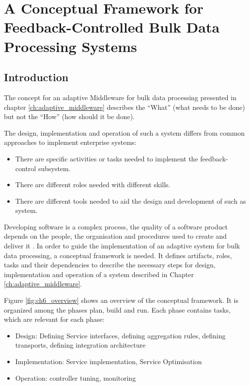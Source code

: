 

\chapter[Conceptual Framework]{A Conceptual Framework for Feedback-Controlled Bulk Data Processing Systems}\label{ch:conceptual_framework}

\section{Introduction} 

The concept for an adaptive Middleware for bulk data processing presented in chapter \ref{ch:adaptive_middleware} describes the ``What'' (what needs to be done) but not the ``How'' (how should it be done).

The design, implementation and operation of such a system differs from common approaches to implement enterprise systems:
\begin{itemize}
	\item There are specific activities or tasks needed to implement the feedback-control subsystem.
	\item There are different roles needed with different skills.
	\item There are different tools needed to aid the design and development of such as system.
\end{itemize}

Developing software is a complex process, the quality of a software product depends on the people, the organisation and procedures used to create and deliver it \citep{Fuggetta:2000ds}.
In order to guide the implementation of an adaptive system for bulk data processing, a conceptual framework is needed. It defines artifacts, roles, tasks and their dependencies to describe the necessary steps for design, implementation and operation of a system described in Chapter \ref{ch:adaptive_middleware}.

Figure \ref{fig:ch6_overview} shows an overview of the conceptual framework. It is organized among the phases plan, build and run. Each phase contains tasks, which are relevant for each phase:
\begin{itemize}
	\item Design: Defining Service interfaces, defining aggregation rules, defining transports, defining integration architecture
	\item Implementation: Service implementation, Service Optimisation
	\item Operation: controller tuning, monitoring
\end{itemize}

